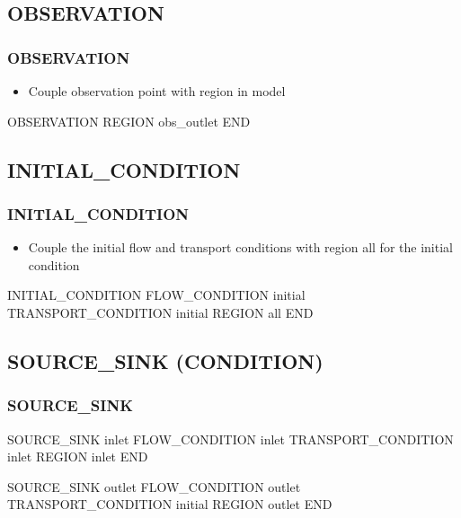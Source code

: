 \documentclass{beamer}
\newcommand\greencomment[1]{{{\color{green} #1}}}
\begin{document}
\subsection{OBSERVATION}

\begin{frame}[fragile]\frametitle{\bf OBSERVATION}

\begin{itemize}
\item Couple observation point with region in model
\end{itemize}

\begin{semiverbatim}
OBSERVATION
  REGION obs_outlet
END
\end{semiverbatim}

\end{frame}

\subsection{INITIAL\_CONDITION}

\begin{frame}[fragile]\frametitle{\bf INITIAL\_CONDITION}

\begin{itemize}
\item Couple the \greencomment{initial} flow and transport conditions with region \greencomment{all} for the initial condition
\end{itemize}

\begin{semiverbatim}

INITIAL_CONDITION
  FLOW_CONDITION initial
  TRANSPORT_CONDITION initial
  REGION all
END

\end{semiverbatim}

\end{frame}


\subsection{SOURCE\_SINK (CONDITION)}

\begin{frame}[fragile]
\frametitle{\bf SOURCE\_SINK}

\begin{semiverbatim}

SOURCE_SINK inlet
  FLOW_CONDITION inlet
  TRANSPORT_CONDITION inlet
  REGION inlet
END

SOURCE_SINK outlet
  FLOW_CONDITION outlet
  TRANSPORT_CONDITION initial
  REGION outlet
END
\end{semiverbatim}

\end{frame}
\end{document}
